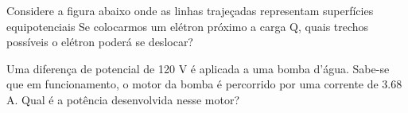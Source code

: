 \documentclass[12pt, addpoints]{exam}
\begin{document}
\begin{questions}
\begin{multicols*}{2}
\begin{oneparchoices}
\end{oneparchoices}
\question[20] Considere a figura abaixo onde as linhas trajeçadas representam superfícies equipotenciais Se colocarmos um elétron próximo a carga Q, quais trechos possíveis o elétron poderá se deslocar?
        
        \begin{center}
            \begin{minipage}[c]{0.5\linewidth}
            \end{minipage}
        \end{center}
        
        

\begin{oneparchoices}
\end{oneparchoices}
\question[20] Uma diferença de potencial de 120 V é aplicada a uma bomba d’água. Sabe-se que em funcionamento, o motor da bomba é percorrido por uma corrente de    3.68 A. Qual é a potência desenvolvida nesse motor?


\end{multicols*}
\end{questions}
\end{document}

